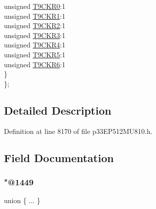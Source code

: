 \begin{DoxyCompactItemize}
\begin{tabbing}
\>\>unsigned \hyperlink{structtag_r_p_i_n_r6_b_i_t_s_a57d8b616f28727dbef92292e4a2cadae}{T9CKR0}:1\\
\>\>unsigned \hyperlink{structtag_r_p_i_n_r6_b_i_t_s_ae1d5bd02f41e58156190d828d5a71dd8}{T9CKR1}:1\\
\>\>unsigned \hyperlink{structtag_r_p_i_n_r6_b_i_t_s_a42a9f5a88b1d6b72ccc3549a3a1e567a}{T9CKR2}:1\\
\>\>unsigned \hyperlink{structtag_r_p_i_n_r6_b_i_t_s_a5e14a8796c0ba3b39b19660fd7bc7a02}{T9CKR3}:1\\
\>\>unsigned \hyperlink{structtag_r_p_i_n_r6_b_i_t_s_a67bdb64f40b056ca7d34aede01ed8837}{T9CKR4}:1\\
\>\>unsigned \hyperlink{structtag_r_p_i_n_r6_b_i_t_s_a400b840b114275cfb7604bf00679a318}{T9CKR5}:1\\
\>\>unsigned \hyperlink{structtag_r_p_i_n_r6_b_i_t_s_ac2eb7628b486b6927ac46fde3b617f79}{T9CKR6}:1\\
\>\} \\
\}; \\

\end{tabbing}\end{DoxyCompactItemize}


\subsection{Detailed Description}


Definition at line 8170 of file p33\+E\+P512\+M\+U810.\+h.



\subsection{Field Documentation}
\mbox{\label{structtag_r_p_i_n_r6_b_i_t_s_a58a7dd899ec7e720484a7fa5389758ad}} 
\subsubsection{\texorpdfstring{"@1449}{@1449}}
{\footnotesize\ttfamily union \{ ... \} }

\mbox{\label{structtag_r_p_i_n_r6_b_i_t_s_adf71f3d8410c1f1dbbc96680a92c49af}} 
